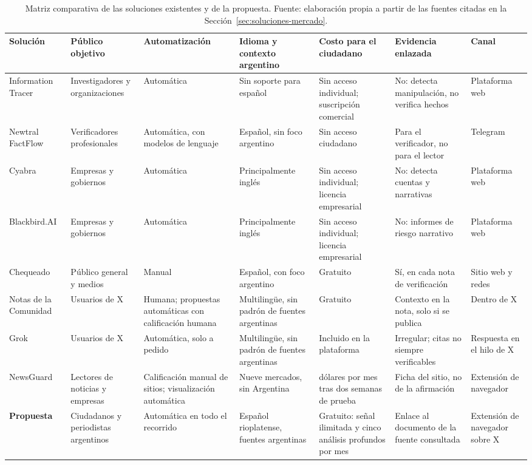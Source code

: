 \begin{table}[t]
  \centering
  \footnotesize
  \setlength{\tabcolsep}{3pt}
  \renewcommand{\arraystretch}{1.15}
  \caption{Matriz comparativa de las soluciones existentes y de la propuesta. Fuente: elaboración propia a partir de las fuentes citadas en la Sección~\ref{sec:soluciones-mercado}.}
  \label{tab:competidores}
  \begin{tabular}{>{\raggedright\arraybackslash}p{1.85cm} >{\raggedright\arraybackslash}p{2.05cm} >{\raggedright\arraybackslash}p{2.3cm} >{\raggedright\arraybackslash}p{2.1cm} >{\raggedright\arraybackslash}p{2.1cm} >{\raggedright\arraybackslash}p{2.15cm} >{\raggedright\arraybackslash}p{1.85cm}}
    \hline
    \textbf{Solución} & \textbf{Público objetivo} & \textbf{Automatización} & \textbf{Idioma y contexto argentino} & \textbf{Costo para el ciudadano} & \textbf{Evidencia enlazada} & \textbf{Canal} \\
    \hline
    Information Tracer & Investigadores y organizaciones & Automática & Sin soporte para español & Sin acceso individual; suscripción comercial & No: detecta manipulación, no verifica hechos & Plataforma web \\
    Newtral FactFlow & Verificadores profesionales & Automática, con modelos de lenguaje & Español, sin foco argentino & Sin acceso ciudadano & Para el verificador, no para el lector & Telegram \\
    Cyabra & Empresas y gobiernos & Automática & Principalmente inglés & Sin acceso individual; licencia empresarial & No: detecta cuentas y narrativas & Plataforma web \\
    Blackbird.AI & Empresas y gobiernos & Automática & Principalmente inglés & Sin acceso individual; licencia empresarial & No: informes de riesgo narrativo & Plataforma web \\
    Chequeado & Público general y medios & Manual & Español, con foco argentino & Gratuito & Sí, en cada nota de verificación & Sitio web y redes \\
    Notas de la Comunidad & Usuarios de X & Humana; propuestas automáticas con calificación humana & Multilingüe, sin padrón de fuentes argentinas & Gratuito & Contexto en la nota, solo si se publica & Dentro de X \\
    Grok & Usuarios de X & Automática, solo a pedido & Multilingüe, sin padrón de fuentes argentinas & Incluido en la plataforma & Irregular; citas no siempre verificables & Respuesta en el hilo de X \\
    NewsGuard & Lectores de noticias y empresas & Calificación manual de sitios; visualización automática & Nueve mercados, sin Argentina & 8 dólares por mes tras dos semanas de prueba & Ficha del sitio, no de la afirmación & Extensión de navegador \\
    \hline
    \textbf{Propuesta} & Ciudadanos y periodistas argentinos & Automática en todo el recorrido & Español rioplatense, fuentes argentinas & Gratuito: señal ilimitada y cinco análisis profundos por mes & Enlace al documento de la fuente consultada & Extensión de navegador sobre X \\
    \hline
  \end{tabular}
\end{table}

